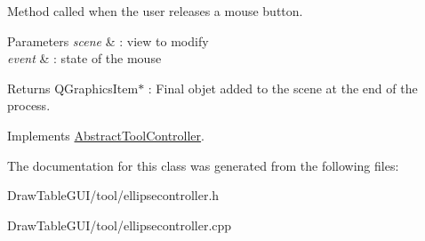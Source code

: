 Method called when the user releases a mouse button. 


\begin{DoxyParams}{Parameters}
{\em scene} & \+: view to modify \\
\hline
{\em event} & \+: state of the mouse\\
\hline
\end{DoxyParams}
\begin{DoxyReturn}{Returns}
Q\+Graphics\+Item$\ast$ \+: Final objet added to the scene at the end of the process. 
\end{DoxyReturn}


Implements \hyperlink{classAbstractToolController_a8815614e51c7c47d3234f4ce3d8384ea}{Abstract\+Tool\+Controller}.



The documentation for this class was generated from the following files\+:\begin{DoxyCompactItemize}
\item 
Draw\+Table\+G\+U\+I/tool/ellipsecontroller.\+h\item 
Draw\+Table\+G\+U\+I/tool/ellipsecontroller.\+cpp\end{DoxyCompactItemize}
